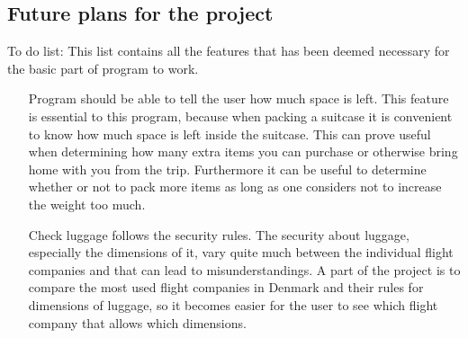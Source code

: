 \subsection{Future plans for the project}


To do list:
This list contains all the features that has been deemed necessary for the basic part of program to work.

\begin{itemize}
\item[Program should be able to tell the user how much space is left.]
This feature is essential to this program, because when packing a suitcase it is convenient to know how much space is left inside the suitcase. This can prove useful when determining how many extra items you can purchase or otherwise bring home with you from the trip. Furthermore it can be useful to determine whether or not to pack more items as long as one considers not to increase the weight too much.

\item[Check luggage follows the security rules.]
The security about luggage, especially the dimensions of it, vary quite much between the individual flight companies and that can lead to misunderstandings. A part of the project is to compare the most used flight companies in Denmark and their rules for dimensions of luggage, so it becomes easier for the user to see which flight company that allows which dimensions. 
\end{itemize}

